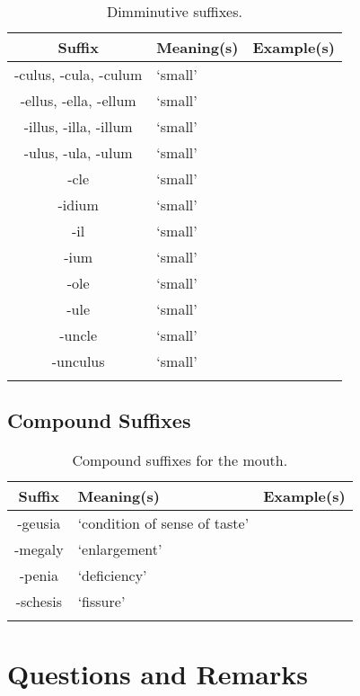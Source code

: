\begin{longtable}{c | p{} | p{}}
    \caption{Dimminutive suffixes.}
    \hline
    Suffix & Meaning(s) & Example(s) \\ \hline
        -culus, -cula, -culum & `small' & \\
        -ellus, -ella, -ellum & `small' & \\
        -illus, -illa, -illum & `small' & \\
        -ulus, -ula, -ulum & `small' & \\
        -cle & `small' & \\
        -idium & `small' & \\
        -il & `small' & \\
        -ium & `small' & \\
        -ole & `small' & \\
        -ule & `small' & \\
        -uncle & `small' & \\
        -unculus & `small' & \\
    \label{tab:Ch8Suffix2}
\end{longtable}


\subsection{Compound Suffixes}

\begin{longtable}{c | p{} | p{}}
    \caption{Compound suffixes for the mouth.}
    \hline
    Suffix & Meaning(s) & Example(s) \\ \hline
        -geusia & `condition of sense of taste' & \\
        -megaly & `enlargement' & \\
        -penia & `deficiency' & \\
        -schesis & `fissure' & \\
    \label{tab:Ch8Suffix3}
\end{longtable}

\section{Questions and Remarks}
\label{sec:QR8}






%
%
%


